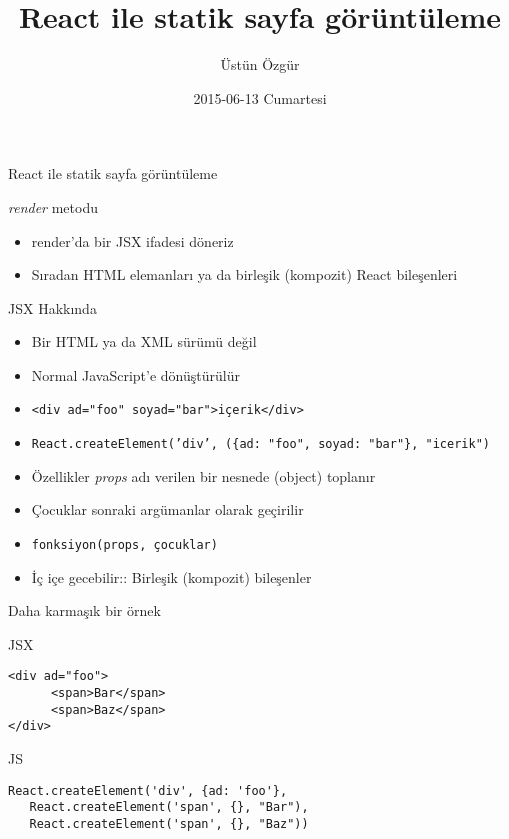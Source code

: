 \documentclass[presentation]{beamer}
\author{Üstün Özgür}
\date{2015-06-13 Cumartesi}
\title{React ile statik sayfa görüntüleme}
\begin{document}
\maketitle

\begin{frame}[label=sec-1]{React ile statik sayfa görüntüleme}
\begin{block}{\emph{render} metodu}
\begin{itemize}
\item render'da bir JSX ifadesi döneriz
\item Sıradan HTML elemanları ya da birleşik (kompozit) React bileşenleri
\end{itemize}
\end{block}
\end{frame}

\begin{frame}[fragile,label=sec-2]{JSX Hakkında}
 \begin{itemize}
\item Bir HTML ya da XML sürümü değil
\item Normal JavaScript'e dönüştürülür
\item \verb~<div ad="foo" soyad="bar">içerik</div>~
\item \texttt{React.createElement('div', (\{ad: "foo", soyad: "bar"\}, "icerik")}
\item Özellikler \emph{props} adı verilen bir nesnede (object) toplanır
\item Çocuklar sonraki argümanlar olarak geçirilir
\item \texttt{fonksiyon(props, çocuklar)}
\item İç içe gecebilir:: Birleşik (kompozit) bileşenler
\end{itemize}
\end{frame}

\begin{frame}[fragile,label=sec-3]{Daha karmaşık bir örnek}
 \begin{block}{JSX}
\begin{verbatim}
<div ad="foo">
      <span>Bar</span>
      <span>Baz</span>
</div>
\end{verbatim}
\end{block}
\begin{block}{JS}
\begin{verbatim}
React.createElement('div', {ad: 'foo'},
   React.createElement('span', {}, "Bar"),
   React.createElement('span', {}, "Baz"))
\end{verbatim}
\end{block}
\end{frame}
\end{document}

